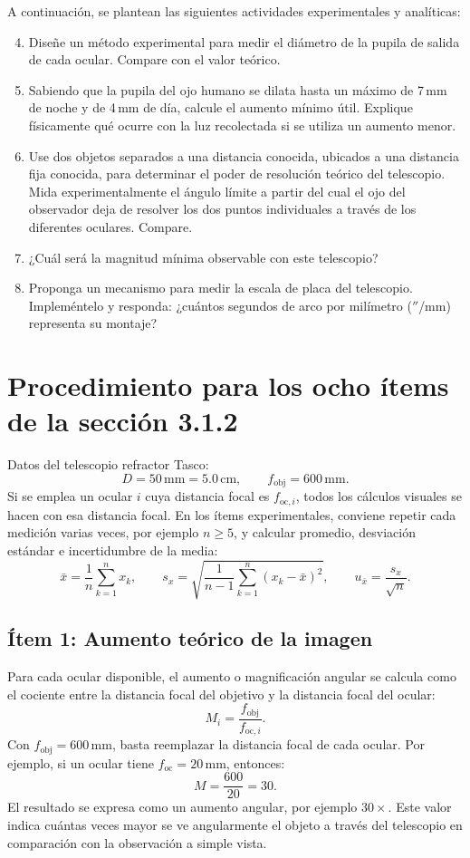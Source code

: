 A continuación, se plantean las siguientes actividades experimentales y analíticas:

\begin{enumerate}
    \setcounter{enumi}{3}
    \item Diseñe un método experimental para medir el diámetro de la pupila de salida de cada ocular. Compare con el valor teórico.
    \item Sabiendo que la pupila del ojo humano se dilata hasta un máximo de 7\,mm de noche y de 4\,mm de día, calcule el aumento mínimo útil. Explique físicamente qué ocurre con la luz recolectada si se utiliza un aumento menor.
    \item Use dos objetos separados a una distancia conocida, ubicados a una distancia fija conocida, para determinar el poder de resolución teórico del telescopio. Mida experimentalmente el ángulo límite a partir del cual el ojo del observador deja de resolver los dos puntos individuales a través de los diferentes oculares. Compare.
    \item ¿Cuál será la magnitud mínima observable con este telescopio?
    \item Proponga un mecanismo para medir la escala de placa del telescopio. Impleméntelo y responda: ¿cuántos segundos de arco por milímetro ($''$/mm) representa su montaje?
\end{enumerate}


\section{Procedimiento para los ocho ítems de la sección 3.1.2}

Datos del telescopio refractor Tasco:
$$
D = 50\,\mathrm{mm} = 5.0\,\mathrm{cm},
\qquad
f_{\mathrm{obj}} = 600\,\mathrm{mm}.
$$
Si se emplea un ocular $i$ cuya distancia focal es $f_{\mathrm{oc},i}$, todos los cálculos visuales se hacen con esa distancia focal. En los ítems experimentales, conviene repetir cada medición varias veces, por ejemplo $n \geq 5$, y calcular promedio, desviación estándar e incertidumbre de la media:
$$
\bar{x}=\frac{1}{n}\sum_{k=1}^{n}x_k,
\qquad
s_x=\sqrt{\frac{1}{n-1}\sum_{k=1}^{n}(x_k-\bar{x})^2},
\qquad
u_{\bar{x}}=\frac{s_x}{\sqrt{n}}.
$$

\subsection{Ítem 1: Aumento teórico de la imagen}

Para cada ocular disponible, el aumento o magnificación angular se calcula como el cociente entre la distancia focal del objetivo y la distancia focal del ocular:
$$
M_i=\frac{f_{\mathrm{obj}}}{f_{\mathrm{oc},i}}.
$$
Con $f_{\mathrm{obj}}=600\,\mathrm{mm}$, basta reemplazar la distancia focal de cada ocular. Por ejemplo, si un ocular tiene $f_{\mathrm{oc}}=20\,\mathrm{mm}$, entonces:
$$
M=\frac{600}{20}=30.
$$
El resultado se expresa como un aumento angular, por ejemplo $30\times$. Este valor indica cuántas veces mayor se ve angularmente el objeto a través del telescopio en comparación con la observación a simple vista.


